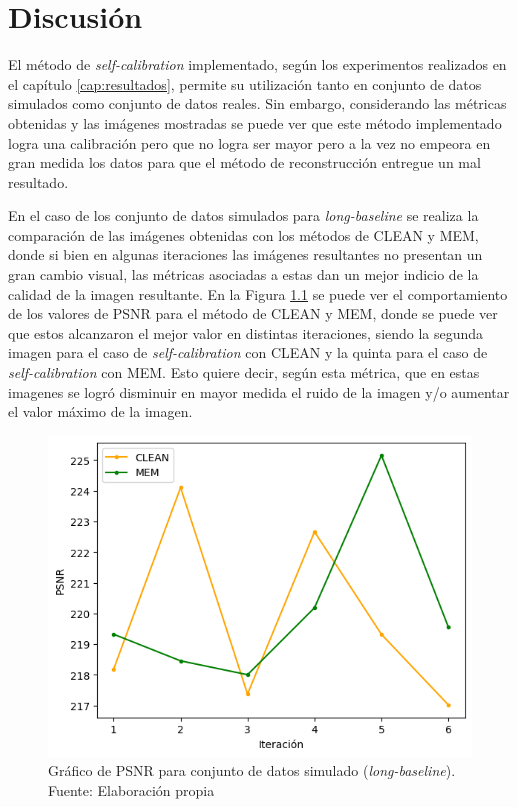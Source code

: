 \chapter{Discusión}
\label{cap:discusion}

El método de \textit{self-calibration} implementado, según los experimentos realizados en el capítulo \ref{cap:resultados}, permite su utilización tanto en conjunto de datos simulados como conjunto de datos reales. Sin embargo, considerando las métricas obtenidas y las imágenes mostradas se puede ver que este método implementado logra una calibración pero que no logra ser mayor pero a la vez no empeora en gran medida los datos para que el método de reconstrucción entregue un mal resultado. 

En el caso de los conjunto de datos simulados para \textit{long-baseline} se realiza la comparación de las imágenes obtenidas con los métodos de CLEAN y MEM, donde si bien en algunas iteraciones las imágenes resultantes no presentan un gran cambio visual, las métricas asociadas a estas dan un mejor indicio de la calidad de la imagen resultante. En la Figura \ref{fig:PSNR_plot} se puede ver el comportamiento de los valores de PSNR para el método de CLEAN y MEM, donde se puede ver que estos alcanzaron el mejor valor en distintas iteraciones, siendo la segunda imagen para el caso de \textit{self-calibration} con CLEAN y la quinta para el caso de \textit{self-calibration} con MEM. Esto quiere decir, según esta métrica, que en estas imagenes se logró disminuir en mayor medida el ruido de la imagen y/o aumentar el valor máximo de la imagen.   

\begin{figure}[!ht]
	\centering
	\captionsetup{justification=centering}
	\includegraphics[scale=0.4]{images/PSNR_plot.png}
	\caption[Gráfico de PSNR para conjunto de datos simulado (\textit{long\_baseline})]{Gráfico de PSNR para conjunto de datos simulado (\textit{long-baseline}). Fuente: Elaboración propia}
	\label{fig:PSNR_plot}
\end{figure}

